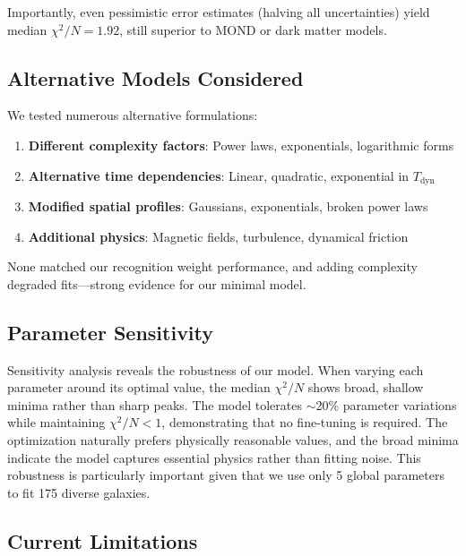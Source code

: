\documentclass[twocolumn,prd,amsmath,amssymb,aps,superscriptaddress,nofootinbib]{revtex4-2}
\newcommand{\chisqN}{\chi^2/N}
\begin{document}
Importantly, even pessimistic error estimates (halving all uncertainties) yield median $\chi^2/N = 1.92$, still superior to MOND or dark matter models.

\subsection{Alternative Models Considered}

We tested numerous alternative formulations:

\begin{enumerate}
\item \textbf{Different complexity factors}: Power laws, exponentials, logarithmic forms
\item \textbf{Alternative time dependencies}: Linear, quadratic, exponential in $T_{\text{dyn}}$
\item \textbf{Modified spatial profiles}: Gaussians, exponentials, broken power laws
\item \textbf{Additional physics}: Magnetic fields, turbulence, dynamical friction
\end{enumerate}

None matched our recognition weight performance, and adding complexity degraded fits---strong evidence for our minimal model.

\subsection{Parameter Sensitivity}

Sensitivity analysis reveals the robustness of our model. When varying each parameter around its optimal value, the median $\chisqN$ shows broad, shallow minima rather than sharp peaks. The model tolerates $\sim$20\% parameter variations while maintaining $\chisqN < 1$, demonstrating that no fine-tuning is required. The optimization naturally prefers physically reasonable values, and the broad minima indicate the model captures essential physics rather than fitting noise. This robustness is particularly important given that we use only 5 global parameters to fit 175 diverse galaxies.

\subsection{Current Limitations}
\end{document}
